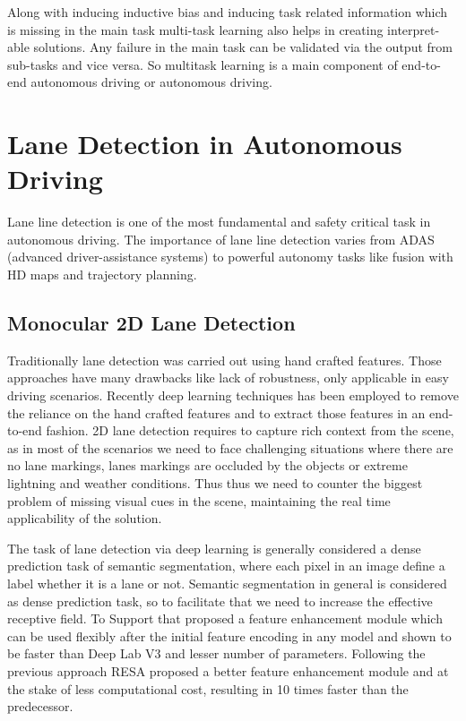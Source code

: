     Along with inducing inductive bias and inducing task related information which is missing in the main task multi-task learning also helps in creating interpret-able solutions. Any failure in the main task can be validated via the output from sub-tasks and vice versa. So multitask learning is a main component of end-to-end autonomous driving or autonomous driving.  

    \section{Lane Detection in Autonomous Driving}
    Lane line detection is one of the most fundamental and safety critical task in autonomous driving. The importance of lane line detection varies from ADAS (advanced driver-assistance systems) to powerful autonomy tasks like fusion with HD maps and trajectory planning.
        \subsection{Monocular 2D Lane Detection}
        Traditionally lane detection was carried out using hand crafted features. Those approaches have many drawbacks like lack of robustness, only applicable in easy driving scenarios. Recently deep learning techniques has been employed to remove the reliance on the hand crafted features and to extract those features in an end-to-end fashion. 2D lane detection requires to capture rich context from the scene, as in most of the scenarios we need to face challenging situations where there are no lane markings, lanes markings are occluded by the objects or extreme lightning and weather conditions. Thus thus we need to counter the biggest problem of missing visual cues in the scene, maintaining the real time applicability of the solution.
        
        The task of lane detection via deep learning is generally considered a dense prediction task of semantic segmentation, where each pixel in an image define a label whether it is a lane or not. Semantic segmentation in general is considered as dense prediction task, so to facilitate that we need to increase the effective receptive field. To Support that \cite{DBLP:journals/corr/abs-1712-06080} proposed a feature enhancement module which can be used flexibly after the initial feature encoding in any model and shown to be faster than Deep Lab V3 \cite{DBLP:journals/corr/ChenPSA17} and lesser number of parameters. Following the previous approach RESA \cite{DBLP:journals/corr/abs-2008-13719} proposed a better feature enhancement module and at the stake of less computational cost, resulting in 10 times faster than the predecessor. 
        
